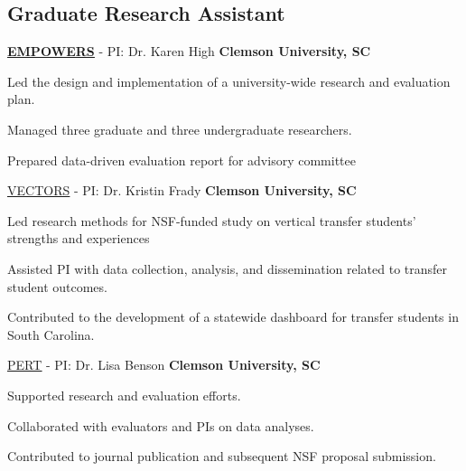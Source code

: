 
\subsection{Graduate Research Assistant}
\begin{cvtable}
        {\color{cvsectioncolor}\href{https://www.nsf.gov/awardsearch/showAward?AWD_ID=2429719&HistoricalAwards=false}{\underline{\textbf{EMPOWERS}}} - PI: Dr. Karen High}
        {\textbf{Clemson University, SC}}
        {\begin{tightitemize}
            \item Led the design and implementation of a university-wide research and evaluation plan.
            \item Managed three graduate and three undergraduate researchers.
            \item Prepared data-driven evaluation report for advisory committee
        \end{tightitemize}}
        {\color{cvsectioncolor}\href{https://www.nsf.gov/awardsearch/showAward?AWD_ID=2144213&HistoricalAwards=false}{\underline{VECTORS}} - PI: Dr. Kristin Frady}
        {\textbf{Clemson University, SC}}
        {\begin{tightitemize}
            \item Led research methods for NSF-funded study on vertical transfer students' strengths and experiences
            \item Assisted PI with data collection, analysis, and dissemination related to transfer student outcomes.
            \item Contributed to the development of a statewide dashboard for transfer students in South Carolina.
        \end{tightitemize}}
        {\color{cvsectioncolor}\href{https://www.nsf.gov/awardsearch/showAward?AWD_ID=2037807&HistoricalAwards=false}{\underline{PERT}} - PI: Dr. Lisa Benson}
        {\textbf{Clemson University, SC}}
        {\begin{tightitemize}
            \item Supported research and evaluation efforts.
            \item Collaborated with evaluators and PIs on data analyses.
            \item Contributed to journal publication and subsequent NSF proposal submission.
        \end{tightitemize}}
\end{cvtable}

